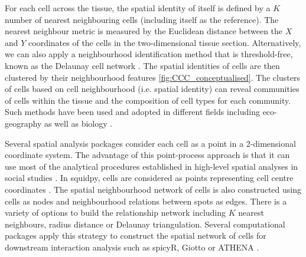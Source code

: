 For each cell across the tissue, the spatial identity of itself is defined by a $K$ number of nearest neighbouring cells (including itself as the reference). The nearest neighbour metric is measured by the Euclidean distance between the $X$ and $Y$ coordinates of the cells in the two-dimensional tissue section. Alternatively, we can also apply a neighbourhood identification method that is threshold-free, known as the Delaunay cell network \cite{guibas1985primitives, dries2021giotto}. The spatial identities of cells are then clustered by their neighbourhood features \ref{fig:CCC_conceptualised}. The clusters of cells based on cell neighbourhood (i.e. spatial identity) can reveal communities of cells within the tissue and the composition of cell types for each community. Such methods have been used and adopted in different fields including eco-geography as well as biology \cite{goltsev2018CODEX, dries2021giotto}.

Several spatial analysis packages consider each cell as a point in a 2-dimensional coordinate system. The advantage of this point-process approach is that it can use most of the analytical procedures established in high-level spatial analyses in social studies \cite{yushimito2012voronoi}. In squidpy, cells are considered as points representing cell centre coordinates \cite{palla2022squidpy}. The spatial neighbourhood network of cells is also constructed using cells as nodes and neighbourhood relations between spots as edges. There is a variety of options to build the relationship network including $K$ nearest neighbours, radius distance or Delaunay triangulation. Several computational packages apply this strategy to construct the spatial network of cells for downstream interaction analysis such as spicyR, Giotto or ATHENA \cite{canete2022spicyr, dries2021giotto, martinelli2022athena}.    


